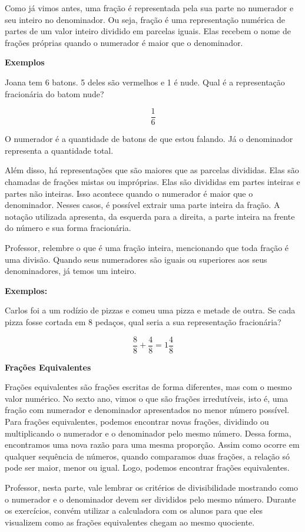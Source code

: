 Como já vimos antes, uma fração é representada pela sua parte no
numerador e seu inteiro no denominador. Ou seja, fração é uma
representação numérica de partes de um valor inteiro dividido em
parcelas iguais. Elas recebem o nome de frações próprias quando o
numerador é maior que o denominador.

\textbf{Exemplos}

Joana tem 6 batons. 5 deles são vermelhos e 1 é nude. Qual é a
representação fracionária do batom nude?

$$\frac{1}{6}$$

O numerador é a quantidade de batons de que estou falando. Já o
denominador representa a quantidade total.

Além disso, há representações que são maiores que as parcelas divididas.
Elas são chamadas de frações mistas ou impróprias. Elas são divididas em
partes inteiras e partes não inteiras. Isso acontece quando o numerador
é maior que o denominador. Nesses casos, é possível extrair uma parte
inteira da fração. A notação utilizada apresenta, da esquerda para a
direita, a parte inteira na frente do número e sua forma fracionária.

Professor, relembre o que é uma fração inteira, mencionando que toda
fração é uma divisão. Quando seus numeradores são iguais ou superiores
aos seus denominadores, já temos um inteiro.

\textbf{Exemplos:}

  Carlos foi a um rodízio de pizzas e comeu uma pizza e metade de outra.
  Se cada pizza fosse cortada em 8 pedaços, qual seria a sua
  representação fracionária?

$$\frac{8}{8}  + \frac{4}{8}  =  1 \frac{4}{8}$$


\textbf{Frações Equivalentes}

Frações equivalentes são frações escritas de forma diferentes, mas com o
mesmo valor numérico. No sexto ano, vimos o que são frações
irredutíveis, isto é, uma fração com numerador e denominador
apresentados no menor número possível. Para frações equivalentes,
podemos encontrar novas frações, dividindo ou multiplicando o numerador
e o denominador pelo mesmo número. Dessa forma, encontramos uma nova
razão para uma mesma proporção. Assim como ocorre em qualquer sequência
de números, quando comparamos duas frações, a relação só pode ser maior,
menor ou igual. Logo, podemos encontrar frações equivalentes.

Professor, nesta parte, vale lembrar os critérios de divisibilidade
mostrando como o numerador e o denominador devem ser divididos pelo
mesmo número. Durante os exercícios, convém utilizar a calculadora com
os alunos para que eles visualizem como as frações equivalentes chegam
ao mesmo quociente.

